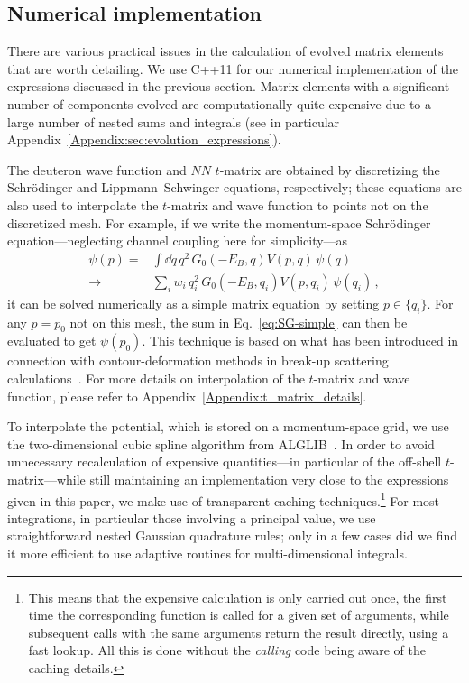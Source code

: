 	\subsection{Numerical implementation}
	\label{subsec:numerical_implementation}

	There are various practical issues in the calculation of evolved matrix
	elements that are worth detailing.  We use C++11 for our numerical
	implementation of	the expressions discussed in the previous section.  Matrix
	elements with a	significant	number of components evolved are computationally
	quite expensive due to a large number of nested sums and integrals (see in
	particular Appendix~\ref{Appendix:sec:evolution_expressions}).

	The deuteron wave function and $NN$ $t$-matrix are obtained by discretizing
	the	Schr\"{o}dinger and Lippmann--Schwinger equations, respectively; these
	equations
	are also used to interpolate the $t$-matrix and wave function to points not on
	the discretized mesh.  For example, if we write the momentum-space Schrödinger
	equation---neglecting channel coupling here for simplicity---as
	\begin{eqnarray}
	 \psi(p) =& \int \dd q\,q^2\,G_0(-E_B,q) V(p,q)\,\psi(q) \nonumber \\
	 \rightarrow& \sum_{i} w_i\,q_i^2\,G_0(-E_B,q_i) V(p,q_i)\,\psi(q_i) \,,
	\label{eq:SG-simple}
  \end{eqnarray}
	it can be solved numerically as a simple matrix equation by setting
	$p\in\{q_i\}$.  For any $p=p_0$ not on this mesh, the sum in
	Eq.~\eqref{eq:SG-simple} can then be evaluated to get $\psi(p_0)$.  This
	technique is based on what has been introduced in connection with
	contour-deformation methods in break-up scattering
	calculations~\cite{Hetherington:1965zza,Schmid:1974}.  For more details on
	interpolation of the $t$-matrix and wave function, please refer to
	Appendix~\ref{Appendix:t_matrix_details}.

	To interpolate the potential, which is stored on a momentum-space grid, we use
	the  two-dimensional cubic spline algorithm from ALGLIB~\cite{ALGLIB:0915}.
	In order to avoid unnecessary recalculation of expensive quantities---in
	particular of the off-shell $t$-matrix---while still maintaining an
	implementation very	close to the expressions given in this paper, we make use
	of transparent caching
	techniques.\footnote{This means that the expensive calculation is only carried
	out once, the first time the corresponding function is called for a given set
	of arguments, while subsequent calls with the same arguments return the result
	directly, using a fast lookup.  All this is done without the \emph{calling}
	code being aware of the caching details.}  For most integrations, in
	particular those involving a  principal value, we use straightforward nested
	Gaussian quadrature
	rules; only in a few cases did we find it more efficient to use adaptive
	routines for multi-dimensional integrals.

